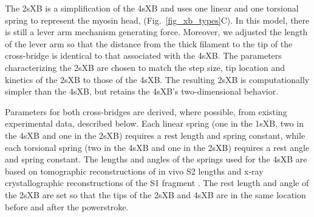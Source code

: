 \documentclass[]{article}
\begin{document}
The 2sXB is a simplification of the 4sXB and uses one linear and one torsional spring to represent the myosin head, (Fig.~\ref{fig_xb_types}C).
In this model, there is still a lever arm mechanism generating force.  
Moreover, we adjusted the length of the lever arm so that the distance from the thick filament to the tip of the cross-bridge is identical to that associated with the 4sXB\@.
The parameters characterizing the 2sXB are chosen to match the step size, tip location and kinetics of the 2sXB to those of the 4sXB\@. 
The resulting 2sXB is computationally simpler than the 4sXB, but retains the 4sXB's two-dimensional behavior.

Parameters for both cross-bridges are derived, where possible, from existing experimental data, described below.  
Each linear spring (one in the 1sXB, two in the 4sXB and one in the 2sXB) requires a rest length and spring constant, while each torsional spring (two in the 4sXB and one in the 2sXB) requires a rest angle and spring constant.
The lengths and angles of the springs used for the 4sXB are based on tomographic reconstructions of in vivo S2 lengths and x-ray crystallographic reconstructions of the S1 fragment \citep{Taylor1999, Rayment1993}.
The rest length and angle of the 2sXB are set so that the tips of the 2sXB and 4sXB are in the same location before and after the powerstroke.
\end{document}
